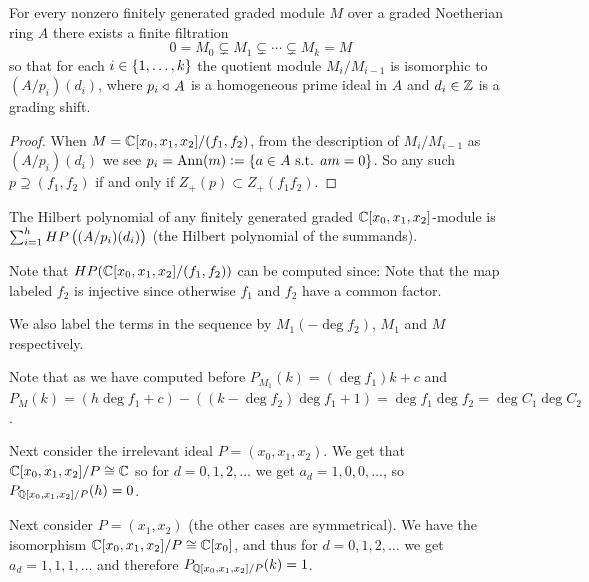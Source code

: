 \documentclass[11pt,a4paper]{article}
\begin{document}
\begin{proposition}
  For every nonzero finitely generated graded module $M$ over a graded
  Noetherian ring $A$ there exists a finite filtration
  \[
    0 = M_0 \subsetneq M_1 \subsetneq \cdots \subsetneq M_k = M
  \]
  so that for each $i \in \left\{1,\dots,k\right\}$ the quotient module $M_i/M_{i-1}$
  is isomorphic to $(A/p_i)(d_i)$, where $p_i \triangleleft\, A$ is a homogeneous
  prime ideal in $A$ and $d_i \in \mathbb{Z}$ is a grading shift.
\end{proposition}
\begin{proof}
  When $M = \mathbb{C}[x_0,x_1,x_2] / (f_1,f_2)$,
  from the description of $M_i/M_{i-1}$ as $(A/p_i)(d_i)$
  we see $p_i = \operatorname{Ann}(m) := \left\{a \in A \text{ s.t. } am = 0\right\}$.
  So any such $p \supseteq (f_1,f_2)$ if and only if
  $Z_+(p) \subset Z_+(f_1 f_2)$.
\end{proof}

\begin{remark}
  The Hilbert polynomial of any finitely generated
  graded $\mathbb{C}[x_0,x_1,x_2]$-module is $\sum_{i=1}^{h} HP\del{(A/p_i)(d_i)}$
  (the Hilbert polynomial of the summands).

  Note that $HP(\mathbb{C}[x_0,x_1,x_2]/(f_1,f_2))$ can be computed since:
Note that the map labeled $f_2$ is injective since otherwise
$f_1$ and $f_2$ have a common factor.

We also label the terms in the sequence by $M_1(-\deg f_2)$, $M_1$
and $M$ respectively.

Note that as we have computed before $P_{M_1}(k) = (\deg f_1) k + c$
and $P_M(k) = (h \deg f_1 + c) - ((k - \deg f_2) \deg f_1 + 1) = \deg f_1 \deg f_2 = \deg C_1 \deg C_2$.


Next consider the irrelevant ideal $P = (x_0,x_1,x_2)$.
We get that $\mathbb{C}[x_0,x_1,x_2] / P \cong \mathbb{C}$ so for $d = 0,1,2,\dots$
we get $a_d = 1,0,0,\dots$, so $P_{\mathbb{Q}[x_0,x_1,x_2]/P}(h) = 0$.

Next consider $P = (x_1,x_2)$ (the other cases are symmetrical).
We have the isomorphism $\mathbb{C}[x_0,x_1,x_2]/P \cong \mathbb{C}[x_0]$,
and thus for $d = 0,1,2,\dots$ we get $a_d = 1,1,1,\dots$
and therefore $P_{\mathbb{Q}[x_0,x_1,x_2]/P}(k) = 1$.

\end{remark}
\end{document}
